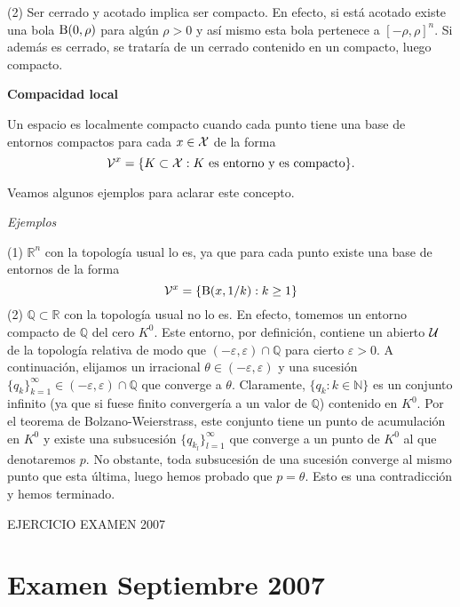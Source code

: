 \begin{itemize}
\begin{obs}
(2) Ser cerrado y acotado implica ser compacto. En efecto, si está acotado existe una bola $\operatorname{B}(0,\rho)$ para algún $\rho >0$ y así mismo esta bola pertenece a $[-\rho,\rho]^n$. Si además es cerrado, se trataría de un cerrado contenido en un compacto, luego compacto. 
\end{obs}

\textbf{Compacidad local}

\begin{defi} Un espacio es localmente compacto cuando cada punto tiene una base de entornos compactos para cada $x\in \mathcal{X}$ de la forma 
\[\mathcal{V}^x=\{K\subset \mathcal{X}: K\text{ es entorno y es compacto}\}.\]
\end{defi}

Veamos algunos ejemplos para aclarar este concepto. 

\textit{Ejemplos}

(1) $\mathbb{R}^n$ con la topología usual lo es, ya que para cada punto existe una base de entornos de la forma
\[\mathcal{V}^x=\{\operatorname{B}(x,1/k):k\geq 1\}\]
(2) $\mathbb{Q}\subset \mathbb{R}$ con la topología usual no lo es. En efecto, tomemos un entorno compacto de $\mathbb{Q}$ del cero $K^0$. Este entorno, por definición, contiene un abierto $\mathcal{U}$ de la topología relativa de modo que $(-\varepsilon,\varepsilon)\cap \mathbb{Q}$ para cierto $\varepsilon>0$. A continuación, elijamos un irracional $\theta \in (-\varepsilon,\varepsilon)$ y una sucesión $\{q_k\}_{k=1}^\infty\in (-\varepsilon,\varepsilon)\cap \mathbb{Q}$ que converge a $\theta$. Claramente, $\{q_k:k\in \mathbb{N}\}$ es un conjunto infinito (ya que si fuese finito convergería a un valor de $\mathbb{Q}$) contenido en $K^0$. Por el teorema de Bolzano-Weierstrass, este conjunto tiene un punto de acumulación en $K^0$ y existe una subsucesión $\{q_{k_l}\}_{l=1}^\infty$ que converge a un punto de $K^0$ al que denotaremos $p$. No obstante, toda subsucesión de una sucesión converge al mismo punto que esta última, luego hemos probado que $p=\theta$. Esto es una contradicción y hemos terminado. 

EJERCICIO EXAMEN 2007

\section{Examen Septiembre 2007}

\end{itemize}

